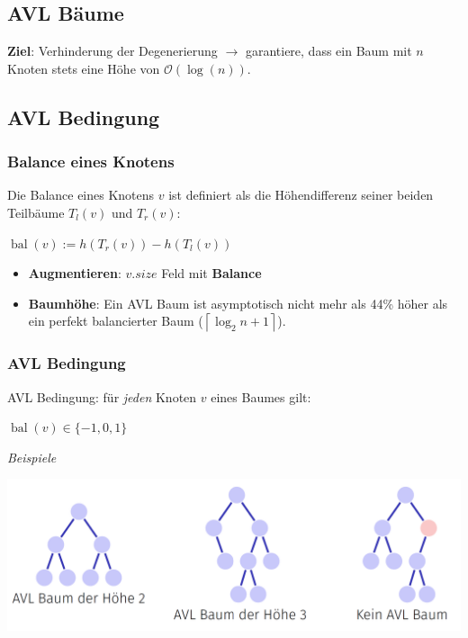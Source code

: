 \vspace{-4pt}
\begin{sectionbox}
\section{AVL Bäume}
\textbf{Ziel}: Verhinderung der Degenerierung $\rightarrow$ garantiere, dass ein Baum mit $n$ Knoten stets eine Höhe von $\mathcal{O}(\operatorname{log}(n))$.\par\smallskip
\subsection{AVL Bedingung}\smallskip
\subsubsection{Balance eines Knotens}\smallskip
Die Balance eines Knotens $v$ ist definiert als die Höhendifferenz seiner beiden Teilbäume $T_{l}(v)$ und $T_{r}(v)$:\par\smallskip
\begin{center}
    $\operatorname{bal}(v):=h\left(T_{r}(v)\right)-h\left(T_{l}(v)\right)$
\end{center}\par\smallskip
\begin{itemize}
    \item \textbf{Augmentieren}: $v.size$ Feld mit \textbf{Balance}
    \item \textbf{Baumhöhe}: Ein AVL Baum ist asymptotisch nicht mehr als 44\% höher als ein perfekt balancierter Baum ($\left\lceil\log _{2} n+1\right\rceil$).
\end{itemize}\par\smallskip

\subsubsection{AVL Bedingung}\smallskip
AVL Bedingung: für \textit{jeden} Knoten $v$ eines Baumes gilt:\par\smallskip
\begin{center}
    $\operatorname{bal}(v) \in\{-1,0,1\}$
\end{center}\par\smallskip

\textit{Beispiele}\par
\begin{center}
    \includegraphics[width = \columnwidth]{../img/BspAVLHoehen.png}
\end{center}

\end{sectionbox}
